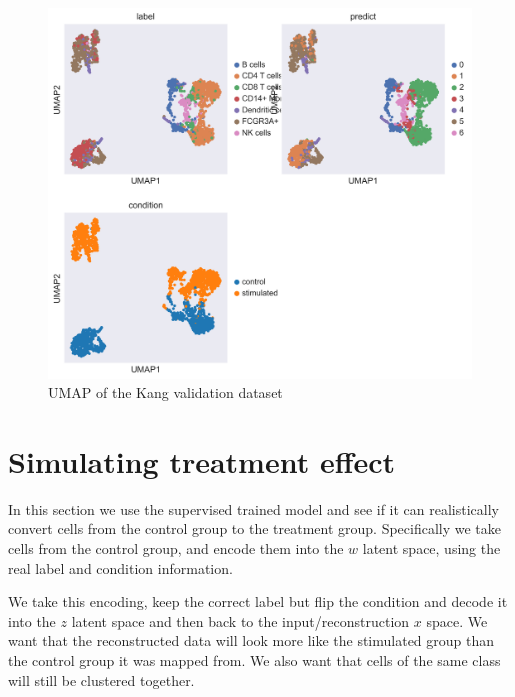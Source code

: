 \documentclass[11pt, a4paper]{report}
\theoremstyle{plain}
\theoremstyle{definition}
\theoremstyle{remark}
\begin{document}
\begin{figure}[h]
\centering
\includegraphics[width=1.1\textwidth]{images/Kang_super_val_umap.png}
\caption{UMAP of the Kang validation dataset
}
\label{fig:Kang_super_val_umap}
\end{figure}

\section{Simulating treatment effect}

In this section we use the supervised trained model and see if it can
realistically convert cells from the control group to the treatment group.
Specifically we take cells from the control group, and encode them into the $w$
latent space, using the real label and condition information.

We take this encoding, keep the correct label but flip the condition and decode
it into the $z$ latent space and then back to the input/reconstruction $x$ space.
We want that the reconstructed data will look more like the stimulated group
than the control group it was mapped from. We also want that cells of the same
class will still be clustered together.
\end{document}
